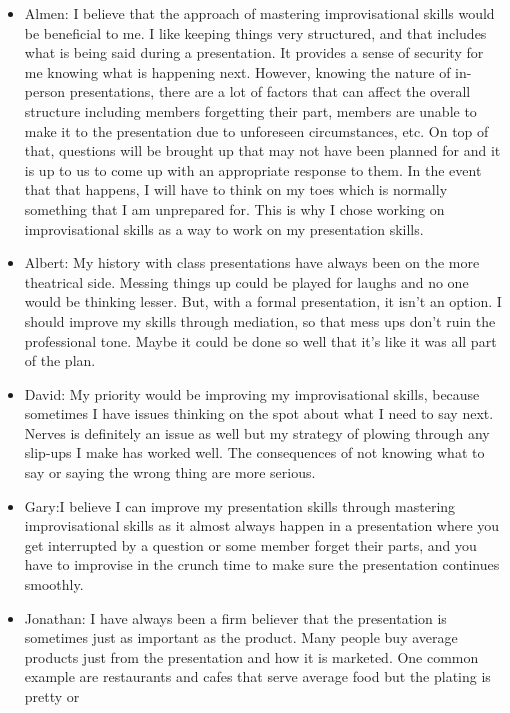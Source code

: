 \documentclass[12pt,letterpaper]{article}
\begin{document}
\begin{itemize}
    \item Almen: I believe that the approach of mastering improvisational skills
    would be beneficial to me. I like keeping things very structured, and that
    includes what is being said during a presentation. It provides a sense of
    security for me knowing what is happening next. However, knowing the nature
    of in-person presentations, there are a lot of factors that can affect the
    overall structure including members forgetting their part, members are
    unable to make it to the presentation due to unforeseen circumstances, etc.
    On top of that, questions will be brought up that may not have been planned
    for and it is up to us to come up with an appropriate response to them. In
    the event that that happens, I will have to think on my toes which is
    normally something that I am unprepared for. This is why I chose working on
    improvisational skills as a way to work on my presentation skills.
    \item Albert: My history with class presentations have always been on the
    more theatrical side. Messing things up could be played for laughs and no
    one would be thinking lesser. But, with a formal presentation, it isn't an
    option. I should improve my skills through mediation, so that mess ups don't
    ruin the professional tone. Maybe it could be done so well that it's like it
    was all part of the plan.
    \item David: My priority would be improving my improvisational skills,
    because sometimes I have issues thinking on the spot about what I need to
    say next. Nerves is definitely an issue as well but my strategy of plowing
    through any slip-ups I make has worked well. The consequences of not knowing
    what to say or saying the wrong thing are more serious.
    \item Gary:I believe I can improve my presentation skills through mastering
    improvisational skills as it almost always happen in a presentation where
    you get interrupted by a question or some member forget their parts, and you
    have to improvise in the crunch time to make sure the presentation continues
    smoothly.
    \item Jonathan: I have always been a firm believer that the presentation is
    sometimes just as important as the product. Many people buy average products
    just from the presentation and how it is marketed. One common example are
    restaurants and cafes that serve average food but the plating is pretty or

\end{itemize}
\end{document}
